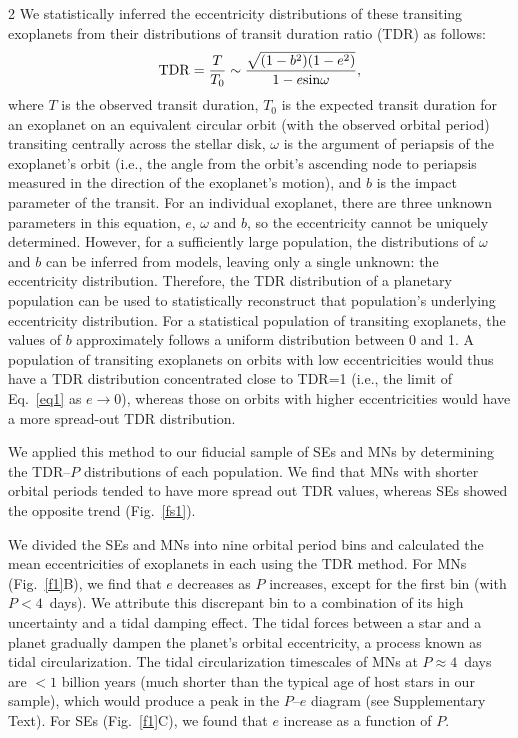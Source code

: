\documentclass[10pt]{article}
\begin{document}
\begin{multicols}{2}
We statistically inferred the eccentricity distributions of these transiting exoplanets from their distributions of transit duration ratio (TDR)\cite{2008ApJ...678.1407F} as follows:
\begin{equation}
{\rm TDR} = \frac{T}{T_0} \sim \frac{\sqrt{(1 - b^2)(1 - e^2)}}{1 - e {\rm sin} \omega},
\label{eq1}
\end{equation}
where $T$ is the observed transit duration, $T_0$ is the expected transit duration for an exoplanet on an equivalent circular orbit (with the observed orbital period) transiting centrally across the stellar disk, $\omega$ is the argument of periapsis of the exoplanet's orbit (i.e., the angle from the orbit's ascending node to periapsis measured in the direction of the exoplanet's motion), and $b$ is the impact parameter of the transit.
For an individual exoplanet, there are three unknown parameters in this equation, $e$, $\omega$ and $b$, so the eccentricity cannot be uniquely determined.
However, for a sufficiently large population, the distributions of $\omega$ and $b$ can be inferred from models\cite{2016PNAS..11311431X}, leaving only a single unknown: the eccentricity distribution.
Therefore, the TDR distribution of a planetary population can be used to statistically reconstruct that population's underlying eccentricity distribution.
For a statistical population of transiting exoplanets, the values of $b$ approximately follows a uniform distribution between 0 and 1\cite{2016MNRAS.463.1323K}.
A population of transiting exoplanets on orbits with low eccentricities would thus have a TDR distribution concentrated close to TDR=1 (i.e., the limit of Eq.~\ref{eq1} as $e \to 0$), whereas those on orbits with higher eccentricities would have a more spread-out TDR distribution.

We applied this method to our fiducial sample of SEs and MNs by determining the TDR--$P$ distributions of each population.
We find that MNs with shorter orbital periods tended to have more spread out TDR values, whereas SEs showed the opposite trend (Fig.~\ref{fs1}).

We divided the SEs and MNs into nine orbital period bins and calculated the mean eccentricities of exoplanets in each using the TDR method\cite{2016PNAS..11311431X,2023AJ....165..125A,methods}.
For MNs (Fig.~\ref{f1}B), we find that $e$ decreases as $P$ increases, except for the first bin (with $P<4$~days).
We attribute this discrepant bin to a combination of its high uncertainty and a tidal damping effect.
The tidal forces between a star and a planet gradually dampen the planet's orbital eccentricity, a process known as tidal circularization.
The tidal circularization timescales of MNs at $P\approx4$~days are $<1$ billion years (much shorter than the typical age of host stars in our sample), which would produce a peak in the $P$--$e$ diagram (see Supplementary Text).
For SEs (Fig.~\ref{f1}C), we found that $e$ increase as a function of $P$.
 \end{multicols}
\end{document}

